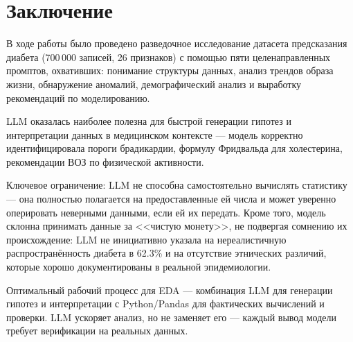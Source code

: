 \documentclass[12pt, a4paper]{article}
\begin{document}
\section{Заключение}

В ходе работы было проведено разведочное исследование датасета предсказания диабета (700\,000 записей, 26 признаков) с помощью пяти целенаправленных промптов, охвативших: понимание структуры данных, анализ трендов образа жизни, обнаружение аномалий, демографический анализ и выработку рекомендаций по моделированию.

LLM оказалась наиболее полезна для быстрой генерации гипотез и интерпретации данных в медицинском контексте --- модель корректно идентифицировала пороги брадикардии, формулу Фридвальда для холестерина, рекомендации ВОЗ по физической активности.

Ключевое ограничение: LLM не способна самостоятельно вычислять статистику --- она полностью полагается на предоставленные ей числа и может уверенно оперировать неверными данными, если ей их передать. Кроме того, модель склонна принимать данные за <<чистую монету>>, не подвергая сомнению их происхождение: LLM не инициативно указала на нереалистичную распространённость диабета в 62.3\% и на отсутствие этнических различий, которые хорошо документированы в реальной эпидемиологии.

Оптимальный рабочий процесс для EDA --- комбинация LLM для генерации гипотез и интерпретации с Python/Pandas для фактических вычислений и проверки. LLM ускоряет анализ, но не заменяет его --- каждый вывод модели требует верификации на реальных данных.
\end{document}
